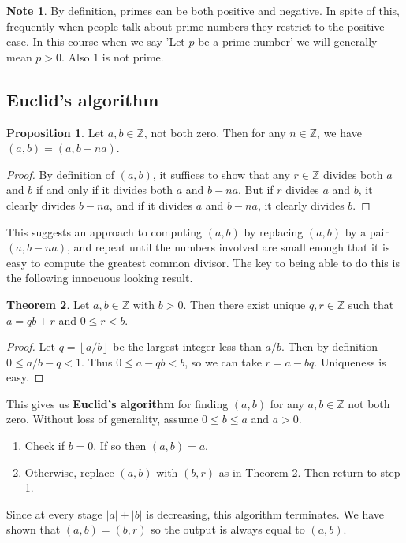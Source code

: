 \documentclass{article}
\newcommand{\Z}{\mathbb{Z}}
\newcommand{\rb}[1]{\left( #1 \right)}
\newcommand{\abs}[1]{\left\lvert #1 \right\rvert}
\newcommand{\fb}[1]{\left\lfloor #1 \right\rfloor}
\theoremstyle{definition}\newtheorem{definition}{Definition}
\theoremstyle{definition}\newtheorem{remark}[definition]{Remark}
\theoremstyle{definition}\newtheorem*{example}{Example}
\theoremstyle{definition}\newtheorem*{note}{Note}
\newtheorem{proposition}[definition]{Proposition}
\newtheorem{theorem}[definition]{Theorem}
\begin{document}
\begin{note}
By definition, primes can be both positive and negative. In spite of this, frequently when people talk about prime numbers they restrict to the positive case. In this course when we say 'Let $ p $ be a prime number' we will generally mean $ p > 0 $. Also $ 1 $ is not prime.
\end{note}

\subsection{Euclid's algorithm}

\begin{proposition}
Let $ a, b \in \Z $, not both zero. Then for any $ n \in \Z $, we have $ \rb{a, b} = \rb{a, b - na} $.
\end{proposition}

\begin{proof}
By definition of $ \rb{a, b} $, it suffices to show that any $ r \in \Z $ divides both $ a $ and $ b $ if and only if it divides both $ a $ and $ b - na $. But if $ r $ divides $ a $ and $ b $, it clearly divides $ b - na $, and if it divides $ a $ and $ b - na $, it clearly divides $ b $.
\end{proof}

This suggests an approach to computing $ \rb{a, b} $ by replacing $ \rb{a, b} $ by a pair $ \rb{a, b - na} $, and repeat until the numbers involved are small enough that it is easy to compute the greatest common divisor. The key to being able to do this is the following innocuous looking result.

\begin{theorem}
\label{thm:5}
Let $ a, b \in \Z $ with $ b > 0 $. Then there exist unique $ q, r \in \Z $ such that $ a = qb + r $ and $ 0 \le r < b $.
\end{theorem}

\begin{proof}
Let $ q = \fb{a / b} $ be the largest integer less than $ a / b $. Then by definition $ 0 \le a / b - q < 1 $. Thus $ 0 \le a - qb < b $, so we can take $ r = a - bq $. Uniqueness is easy.
\end{proof}

This gives us \textbf{Euclid's algorithm} for finding $ \rb{a, b} $ for any $ a, b \in \Z $ not both zero. Without loss of generality, assume $ 0 \le b \le a $ and $ a > 0 $.
\begin{enumerate}
\item Check if $ b = 0 $. If so then $ \rb{a, b} = a $.
\item Otherwise, replace $ \rb{a, b} $ with $ \rb{b, r} $ as in Theorem \ref{thm:5}. Then return to step 1.
\end{enumerate}
Since at every stage $ \abs{a} + \abs{b} $ is decreasing, this algorithm terminates. We have shown that $ \rb{a, b} = \rb{b, r} $ so the output is always equal to $ \rb{a, b} $.
\end{document}
